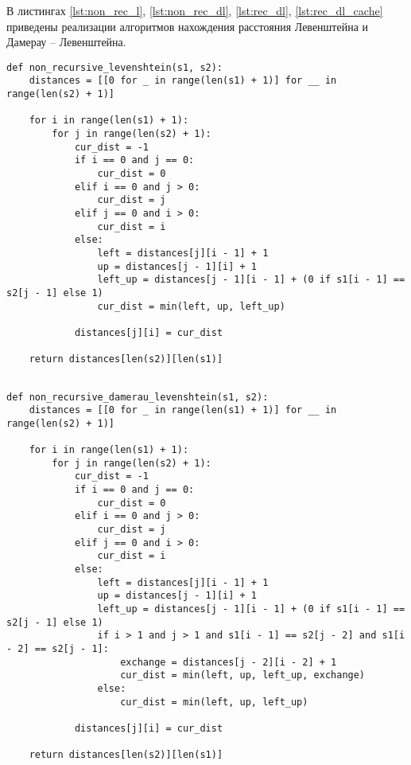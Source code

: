  В листингах \ref{lst:non_rec_l}, \ref{lst:non_rec_dl}, \ref{lst:rec_dl}, \ref{lst:rec_dl_cache} приведены реализации алгоритмов нахождения расстояния Левенштейна и Дамерау -- Левенштейна.

\begin{lstlisting}[label=lst:non_rec_l,caption=Функция нахождения расстояния Левенштейна нерекурсивным методом.]
def non_recursive_levenshtein(s1, s2):
    distances = [[0 for _ in range(len(s1) + 1)] for __ in range(len(s2) + 1)]

    for i in range(len(s1) + 1):
        for j in range(len(s2) + 1):
            cur_dist = -1
            if i == 0 and j == 0:
                cur_dist = 0
            elif i == 0 and j > 0:
                cur_dist = j
            elif j == 0 and i > 0:
                cur_dist = i
            else:
                left = distances[j][i - 1] + 1
                up = distances[j - 1][i] + 1
                left_up = distances[j - 1][i - 1] + (0 if s1[i - 1] == s2[j - 1] else 1)
                cur_dist = min(left, up, left_up)
            
            distances[j][i] = cur_dist

    return distances[len(s2)][len(s1)]
	
\end{lstlisting}

\begin{lstlisting}[label=lst:non_rec_dl,caption=Функция нахождения расстояния Дамерау -- Левенштейна нерекурсивным методом.]
def non_recursive_damerau_levenshtein(s1, s2):
    distances = [[0 for _ in range(len(s1) + 1)] for __ in range(len(s2) + 1)]

    for i in range(len(s1) + 1):
        for j in range(len(s2) + 1):
            cur_dist = -1
            if i == 0 and j == 0:
                cur_dist = 0
            elif i == 0 and j > 0:
                cur_dist = j
            elif j == 0 and i > 0:
                cur_dist = i
            else:
                left = distances[j][i - 1] + 1
                up = distances[j - 1][i] + 1
                left_up = distances[j - 1][i - 1] + (0 if s1[i - 1] == s2[j - 1] else 1)
                if i > 1 and j > 1 and s1[i - 1] == s2[j - 2] and s1[i - 2] == s2[j - 1]:
                    exchange = distances[j - 2][i - 2] + 1
                    cur_dist = min(left, up, left_up, exchange)
                else:
                    cur_dist = min(left, up, left_up)
                
            distances[j][i] = cur_dist

    return distances[len(s2)][len(s1)]
	
\end{lstlisting}


